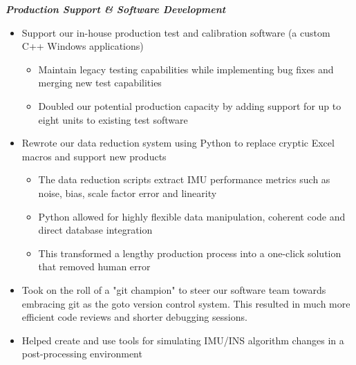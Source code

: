 \documentclass[]{article}
\begin{document}
\begin{singlespace}
\noindent\textbf{\emph{Production Support \& Software Development}}
\vspace{-2mm}
\begin{itemize}
    \setlength\itemsep{0em}
    \item Support our in-house production test and calibration software (a custom C++ Windows applications)
    \vspace{-2mm}
    \begin{itemize}
        \setlength\itemsep{0em}
        \item Maintain legacy testing capabilities while implementing bug fixes and merging new test capabilities
        \item Doubled our potential production capacity by adding support for up to eight units to existing test software
    \end{itemize}

    \vspace{-1mm}
    \item Rewrote our data reduction system using Python to replace cryptic Excel macros and support new products 
    \vspace{-2mm}
    \begin{itemize}
        \setlength\itemsep{0em}
        \item The data reduction scripts extract IMU performance metrics such as noise, bias, scale factor error and linearity
        \item Python allowed for highly flexible data manipulation, coherent code and direct database integration
        \item This transformed a lengthy production process into a one-click solution that removed human error
    \end{itemize}
    \vspace{-1mm}

    \item Took on the roll of a "git champion" to steer our software team towards embracing git as the goto version control system. This resulted in much more efficient code reviews and shorter debugging sessions.
    \item Helped create and use tools for simulating IMU/INS algorithm changes in a post-processing environment

\end{itemize}


\end{singlespace}
\end{document}
